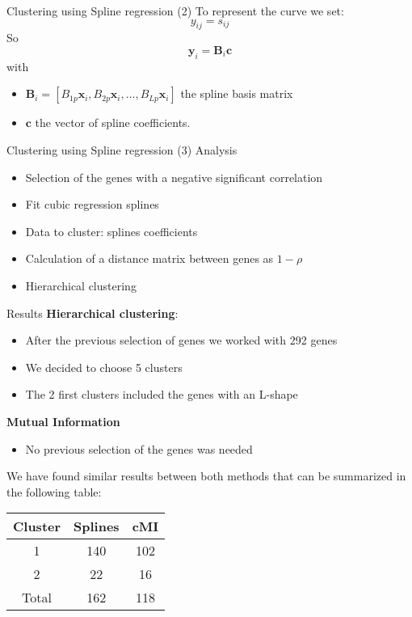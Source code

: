 \documentclass[handout]{beamer}
\begin{document}
\begin{frame}{Clustering using Spline regression (2)}
To represent the curve we set:
\[
y_{ij}=s_{ij}
\]
So
\[ 
\mathbf{y}_i=\mathbf{B}_i\mathbf{c}
\]
with
\begin {itemize}
\item $\mathbf{B}_i=\left[ B_{1p}\mathbf{x}_i,B_{2p}\mathbf{x}_i,\dots,B_{Lp}\mathbf{x}_i \right]$ the spline basis matrix
\item $\mathbf{c}$ the vector of spline coefficients.
\end{itemize}
\end{frame}

\begin{frame}{Clustering using Spline regression (3)}
Analysis
\begin {itemize}
\item Selection of the genes with a negative significant correlation
\item Fit cubic regression splines
\item Data to cluster: splines coefficients
\item Calculation of a distance matrix between genes as $1-\rho$
\item Hierarchical clustering 
\end{itemize}
\end{frame}

\begin {frame}{Results}
\textbf{Hierarchical clustering}:
\begin {itemize}
\item After the previous selection of genes we worked with 292 genes
\item We decided to choose 5 clusters
\item The 2 first clusters included the genes with an L-shape
\end{itemize}
\textbf{Mutual Information}
\begin{itemize}
\item No previous selection of the genes was needed
\end{itemize}
We have found similar results between both methods that can be summarized in the following table:
\begin{center}
\begin{tabular}{|c|c|c|}
\hline
Cluster & Splines & cMI \\
\hline
1 & 140 & 102 \\
2 & 22 & 16 \\
\hline
Total & 162 & 118 \\
\hline
\end{tabular}
\end{center}
\end{frame}

\end{document}
